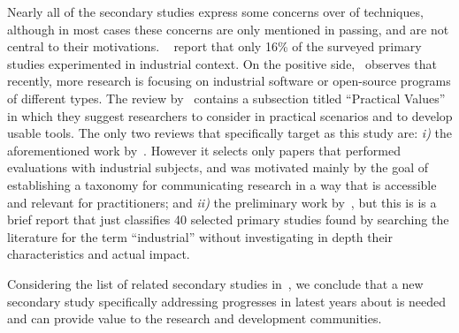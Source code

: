 \vspace{0,2cm}
Nearly all of the secondary studies express some concerns over \rea of \rt techniques, although in most cases these concerns are only mentioned in passing, and are not central to their motivations.
~\citet{rosero_15_2016} report that only 16\% of the surveyed primary studies experimented in industrial context.
On the positive side,~\citet{do_recent_2016} observes that recently, more research is focusing on industrial software or open-source programs of different types.
The review by~\citet{lou_survey_2018} contains a subsection titled ``Practical Values'' in which they suggest researchers to consider \tcp in practical scenarios and to develop usable \tcp tools.
The only two reviews that specifically target \rea as this study are: \textit{i)} the aforementioned work by~\citet{bin_ali_search_2019}. However it selects only papers that performed evaluations with industrial subjects, and was motivated mainly by the goal of establishing a taxonomy for communicating \rt research in a way that is accessible and relevant for practitioners; 
and \textit{ii)} the preliminary work by~\citet{rosero2021software}, but this is is a brief report that just classifies 40 selected primary studies found by searching the \tcp literature for the term ``industrial'' without investigating in depth their characteristics and actual impact.


Considering the list of related secondary studies in~, we conclude that a new secondary study specifically addressing progresses in latest years about \rea is needed and can provide value to the research and development communities.

